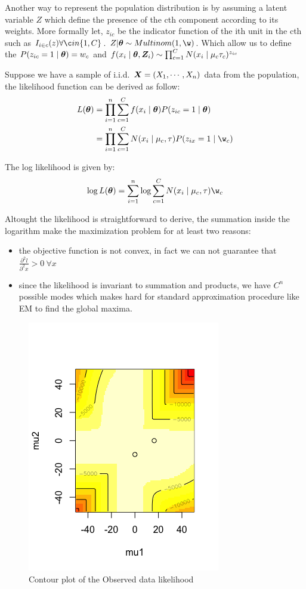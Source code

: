 \documentclass{article}
\begin{document}
Another way to represent the population distribution is by assuming a latent variable $Z$ which define the presence of the cth component according to its weights. More formally let, $z_{ic}$ be the indicator function of the ith unit in the cth such as $I_{i \in c}(z) \forall \c in \{1, C\}$. $Z | \vect \theta \sim Multinom (1, \vect \w)$. Which allow us to define the $P(z_{ic} = 1 \mid \boldsymbol{\theta}) = w_c$ and $f(x_i \mid \boldsymbol{\theta}, \boldsymbol{Z}_i) \sim \prod_{c=1}^C N(x_i \mid \mu_c \tau_c )^{z_{ic}}$

Suppose we have a sample of i.i.d. $\boldsymbol{X} = (X_1, \cdots , X_n)$ data from the population, the likelihood function can be derived as follow:
\begin{equation}
\begin{split}
L(\vect \theta) &= \prod_{i=1}^n  \sum_{c=1}^C f(x_i \mid \vect\theta) P(z_{ic} = 1 \mid \vect \theta ) \\
&= \prod_{i=1}^n \sum_{c=1}^C N(x_i \mid \mu_c, \tau) P(z_{ix} = 1 \mid \w_{c})
\end{split}
\end{equation}

The log likelihood is given by:
\begin{equation}
\log L(\vect \theta)  = \sum_{i=1}^n \log \sum_{c=1}^C N(x_i \mid \mu_c, \tau) \w_{c}
\end{equation}

Altought the likelihood is straightforward to derive, the summation inside the logarithm make the maximization problem for at least two reasons:
\begin{itemize}
\item the objective function is not convex, in fact we can not guarantee that $\frac{\partial^2 l}{\partial^2 x} > 0 \ \forall x$
\item since the likelihood is invariant to summation and products, we have $C^n$ possible modes which makes hard for standard approximation procedure like EM to find the global maxima.
\end{itemize}

\begin{figure}[h!]
    \centering
    \includegraphics[width=.5\textwidth]{Mix_gauss_3.png}
    \caption{Contour plot of the Observed data likelihood}
    \label{Mixture of gaussians}
\end{figure}
\end{document}
